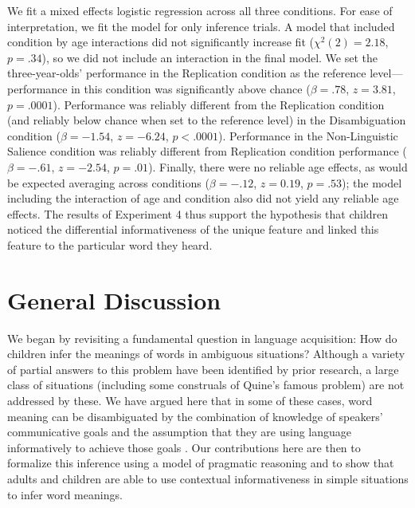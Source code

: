 \documentclass[review]{elsarticle}
\begin{document}

We fit a mixed effects logistic regression across all three conditions. For ease of interpretation, we fit the model for only inference trials. A model that included condition by age interactions did not significantly increase fit ($\chi^2(2)=2.18$, $p = .34$), so we did not include an interaction in the final model. We set the three-year-olds' performance in the Replication condition as the reference level---performance in this condition was significantly above chance ($\beta=.78$, $z=3.81$, $p=.0001$). Performance was reliably different from the Replication condition (and reliably below chance when set to the reference level) in the Disambiguation condition ($\beta=-1.54$, $z=-6.24$, $p<.0001$). Performance in the Non-Linguistic Salience condition was reliably different from Replication condition performance ($\beta=-.61$, $z=-2.54$, $p=.01$). Finally, there were no reliable age effects, as would be expected averaging across conditions ($\beta=-.12$, $z=0.19$, $p=.53$); the model including the interaction of age and condition also did not yield any reliable age effects. The results of Experiment 4 thus support the hypothesis that children noticed the differential informativeness of the unique feature and linked this feature to the particular word they heard. 

\section{General Discussion}

We began by revisiting a fundamental question in language acquisition: How do children infer the meanings of words in ambiguous situations? Although a variety of partial answers to this problem have been identified by prior research, a large class of situations (including some construals of Quine's famous problem) are not addressed by these. We have argued here that in some of these cases, word meaning can be disambiguated by the combination of knowledge of speakers' communicative goals and the assumption that they are using language informatively to achieve those goals \citep{grice1975}. Our contributions here are then to formalize this inference using a model of pragmatic reasoning and to show that adults and children are able to use contextual informativeness in simple situations to infer word meanings.
\end{document}

